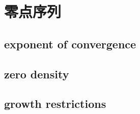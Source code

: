 \section{零点序列}
\label{b3:sec:1903}


\subsection{exponent of convergence}
\label{b3:subsec:190301}

\subsection{zero density}
\label{b3:subsec:190302}

\subsection{growth restrictions}
\label{b3:subsec:190303}



